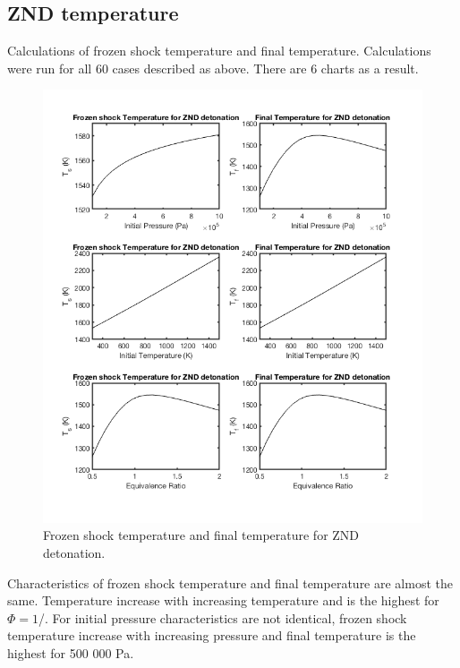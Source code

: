 \documentclass[a4paper]{article}
\newcommand{\sepspace}{\vspace*{1em}}
\begin{document}
\pagebreak

\subsection{ZND temperature}
\sepspace

Calculations of frozen shock temperature and final temperature. Calculations were run for all 60 cases described as above. There are 6 charts as a result.

\begin{figure}[h!]
\centering
\includegraphics[width=1\textwidth]{ZND.png}
\caption{\label{fig:1}Frozen shock temperature and final temperature for ZND detonation.}
\end{figure}

\noindent
Characteristics of frozen shock temperature and final temperature are almost the same. Temperature increase with increasing temperature and is the highest for $\Phi = 1$/. For initial pressure characteristics are not identical,  frozen shock temperature increase with increasing pressure and final temperature is the highest for 500 000 Pa.


\pagebreak
\end{document}

